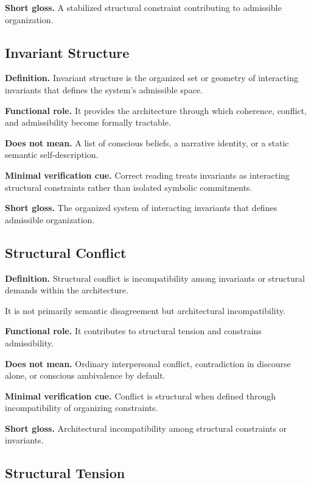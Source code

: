 \documentclass[11pt,a4paper]{article}
\begin{document}
	\textbf{Short gloss.} A stabilized structural constraint contributing to admissible organization.
	
	\subsection{Invariant Structure}
	
	\textbf{Definition.} Invariant structure is the organized set or geometry of interacting invariants that defines the system's admissible space.
	
	\textbf{Functional role.} It provides the architecture through which coherence, conflict, and admissibility become formally tractable.
	
	\textbf{Does not mean.} A list of conscious beliefs, a narrative identity, or a static semantic self-description.
	
	\textbf{Minimal verification cue.} Correct reading treats invariants as interacting structural constraints rather than isolated symbolic commitments.
	
	\textbf{Short gloss.} The organized system of interacting invariants that defines admissible organization.
	
	\subsection{Structural Conflict}
	
	\textbf{Definition.} Structural conflict is incompatibility among invariants or structural demands within the architecture.
	
	It is not primarily semantic disagreement but architectural incompatibility.
	
	\textbf{Functional role.} It contributes to structural tension and constrains admissibility.
	
	\textbf{Does not mean.} Ordinary interpersonal conflict, contradiction in discourse alone, or conscious ambivalence by default.
	
	\textbf{Minimal verification cue.} Conflict is structural when defined through incompatibility of organizing constraints.
	
	\textbf{Short gloss.} Architectural incompatibility among structural constraints or invariants.
	
	\subsection{Structural Tension}
	
\end{document}
